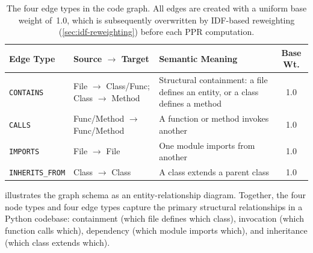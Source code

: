 \begin{table}[H]
    \centering
    \caption[Edge types in the CodeGraph schema]{The four edge types in the code graph. All edges are created with a uniform base weight of~1.0, which is subsequently overwritten by IDF-based reweighting (\cref{sec:idf-reweighting}) before each PPR computation.}
    \label{tab:edge-types}
    \begin{tabularx}{\textwidth}{l l X c}
        \toprule
        \textbf{Edge Type}      & \textbf{Source $\to$ Target}              & \textbf{Semantic Meaning}                                                     & \textbf{Base Wt.} \\
        \midrule
        \texttt{CONTAINS}       & File $\to$ Class/Func; Class $\to$ Method & Structural containment: a file defines an entity, or a class defines a method & 1.0               \\
        \addlinespace[3pt]
        \texttt{CALLS}          & Func/Method $\to$ Func/Method             & A function or method invokes another                                          & 1.0               \\
        \addlinespace[3pt]
        \texttt{IMPORTS}        & File $\to$ File                           & One module imports from another                                               & 1.0               \\
        \addlinespace[3pt]
        \texttt{INHERITS\_FROM} & Class $\to$ Class                         & A class extends a parent class                                                & 1.0               \\
        \bottomrule
    \end{tabularx}
\end{table}

 illustrates the graph schema as an entity-relationship diagram. Together, the four node types and four edge types capture the primary structural relationships in a Python codebase: containment (which file defines which class), invocation (which function calls which), dependency (which module imports which), and inheritance (which class extends which).

